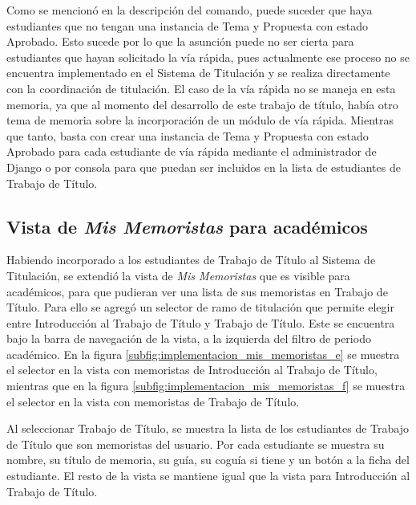 Como se mencionó en la descripción del comando, puede suceder que haya estudiantes que no
tengan una instancia de Tema y Propuesta con estado Aprobado. Esto sucede por lo que la
asunción puede no ser cierta para estudiantes que hayan solicitado la vía rápida, pues
actualmente ese proceso no se encuentra implementado en el Sistema de Titulación y se
realiza directamente con la coordinación de titulación. El caso de la vía rápida no
se maneja en esta memoria, ya que al momento del desarrollo de este trabajo de título,
había otro tema de memoria sobre la incorporación de un módulo de vía rápida. Mientras
que tanto, basta con crear una instancia de Tema y Propuesta con estado Aprobado para
cada estudiante de vía rápida mediante el administrador de Django o por consola para que
puedan ser incluidos en la lista de estudiantes de Trabajo de Título.

\subsection{Vista de \textit{Mis Memoristas} para académicos}
Habiendo incorporado a los estudiantes de Trabajo de Título al Sistema de Titulación,
se extendió la vista de \textit{Mis Memoristas} que es visible para académicos, para que
pudieran ver una lista de sus memoristas en Trabajo de Título. Para ello se agregó un
selector de ramo de titulación que permite elegir entre Introducción al Trabajo de Título
y Trabajo de Título. Este se encuentra bajo la barra de navegación de la vista, a la
izquierda del filtro de periodo académico. En la figura
\ref{subfig:implementacion_mis_memoristas_e} se muestra el selector en la vista con memoristas
de Introducción al Trabajo de Título, mientras que en la figura
\ref{subfig:implementacion_mis_memoristas_f} se muestra el selector en la vista con memoristas
de Trabajo de Título.

Al seleccionar Trabajo de Título, se muestra la lista de los estudiantes de Trabajo de Título
que son memoristas del usuario. Por cada estudiante se muestra su nombre, su título de memoria,
su guía, su coguía si tiene y un botón a la ficha del estudiante. El resto de la vista se mantiene
igual que la vista para Introducción al Trabajo de Título.

